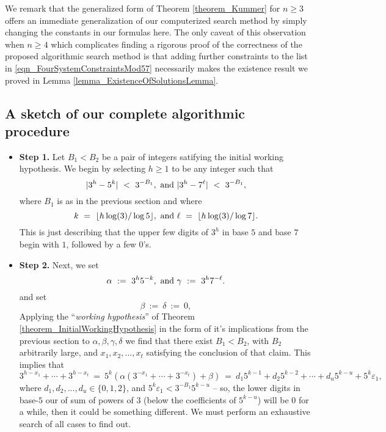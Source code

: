 \documentclass[12pt]{article}
\begin{document}
We remark that the generalized form of Theorem \ref{theorem_Kummer} for $n \geq 3$ offers an 
immediate generalization of our computerized search method by simply changing the constants in our 
formulas here. The only caveat of this observation when $n \geq 4$ which complicates finding a 
rigorous proof of the correctness of the proposed algorithmic search method is that adding further 
constraints to the list in \eqref{eqn_FourSystemConstraintsMod57} necessarily makes the existence 
result we proved in Lemma \ref{lemma_ExistenceOfSolutionsLemma}. 

\subsection{A sketch of our complete algorithmic procedure} 

\begin{itemize} 

\item \textbf{Step 1.} 
Let $B_1 < B_2$ be a pair of integers satifying the initial working hypothesis. 
We begin by selecting $h \geq 1$ to be any integer such that 
$$
|3^h - 5^k|\ <\ 3^{-B_1},\ {\rm and\ } 
|3^h - 7^\ell|\ <\ 3^{-B_1},
$$
where $B_1$ is as in the previous section and where
$$
k\ =\ \lfloor h \log(3) / \log 5 \rfloor,\ {\rm and\ } \ell\ =\ 
\lfloor h \log(3) / \log 7 \rfloor.
$$
This is just describing that the upper few digits of $3^h$ in base $5$ and base
$7$ begin with $1$, followed by a few $0$'s.  

\item \textbf{Step 2.} 
Next, we set 
$$
\alpha\ :=\ 3^h 5^{-k},\ {\rm and\ }\gamma\ :=\ 3^h 7^{-\ell}.
$$
and set
$$
\beta\ :=\ \delta\ :=\ 0,
$$ 
Applying the ``\emph{working hypothesis}'' of Theorem \ref{theorem_InitialWorkingHypothesis} in the 
form of it's implications from the previous section to 
$\alpha,\beta, \gamma, \delta$ we find that there exist $B_1 < B_2$,
with $B_2$ arbitrarily large, 
and $x_1, x_2, ..., x_t$ satisfying the conclusion of that claim.  
This implies that
$$
3^{h-x_1} + \cdots + 3^{h-x_t}\ =\ 5^k ( \alpha (3^{-x_1} + \cdots + 
3^{-x_t}) + \beta)\ =\ d_1 5^{k-1} + d_2 5^{k-2} + \cdots + d_u 5^{k-u}
+ 5^k \varepsilon_1,   
$$
where $d_1,d_2,...,d_u \in \{0,1,2\}$, and 
$5^k \varepsilon_1 < 3^{-B_1} 5^{k-u}$ -- so, the lower digits in base-$5$
our of sum of powers of $3$ (below the coefficients of $5^{k-u}$) 
will be $0$ for a while, then it could be something
different. We must perform an exhaustive search of all cases to find out.  


\end{itemize}
\end{document}
